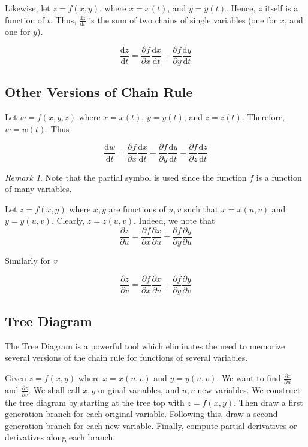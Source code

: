 \documentclass[11pt]{article}
\theoremstyle{plain} %
\theoremstyle{definition}
\theoremstyle{example}
\theoremstyle{remark}
\newtheorem*{remark}{Remark}
\begin{document}
Likewise, let $z=f(x,y)$, where $x=x(t)$, and $y=y(t)$. Hence, $z$ itself is a function of $t$. Thus, $\frac{\mathrm d z}{\mathrm d t}$ is the sum of two chains of single variables (one for $x$, and one for $y$).

$$\frac{\mathrm d z}{\mathrm d t} = \frac{\partial f}{\partial x}\frac{\mathrm d x}{\mathrm d t} + \frac{\partial f}{\partial y}\frac{\mathrm d y}{\mathrm d t}$$

\subsection{Other Versions of Chain Rule}

Let $w=f(x,y,z)$ where $x=x(t)$, $y=y(t)$, and $z=z(t)$. Therefore, $w=w(t)$. Thus

$$\frac{\mathrm d w}{\mathrm d t} = \frac{\partial f}{\partial x}\frac{\mathrm d x}{\mathrm d t} + \frac{\partial f}{\partial y}\frac{\mathrm d y}{\mathrm d t}+\frac{\partial f}{\partial z}\frac{\mathrm d z}{\mathrm d t} $$

\begin{remark}
Note that the partial symbol is used since the function $f$ is a function of many variables.
\end{remark}


Let $z=f(x,y)$ where $x,y$ are functions of $u,v$ such that $x=x(u,v)$ and $y=y(u,v)$. Clearly, $z=z(u,v)$. Indeed, we note that 
$$\frac{\partial z}{\partial u}=\frac{\partial f}{\partial x}\frac{\partial x}{\partial u} +\frac{\partial f}{\partial y}\frac{\partial y}{\partial u}$$

Similarly for $v$

$$\frac{\partial z}{\partial v}=\frac{\partial f}{\partial x}\frac{\partial x}{\partial v} +\frac{\partial f}{\partial y}\frac{\partial y}{\partial v}$$

 

\subsection{Tree Diagram}

The Tree Diagram is a powerful tool which eliminates the need to memorize several versions of the chain rule for functions of several variables.

Given $z=f(x,y)$ where $x=x(u,v)$ and $y=y(u,v)$. We want to find $\frac{\partial z}{\partial u}$ and $\frac{\partial z}{\partial v}$. We shall call $x, y$ original variables, and $u,v$ new variables. We construct the tree diagram by starting at the tree top with $z=f(x,y)$. Then draw a first generation branch for each original variable. Following this, draw a second generation branch for each new variable. Finally, compute partial derivatives or derivatives along each branch. 
\end{document}
